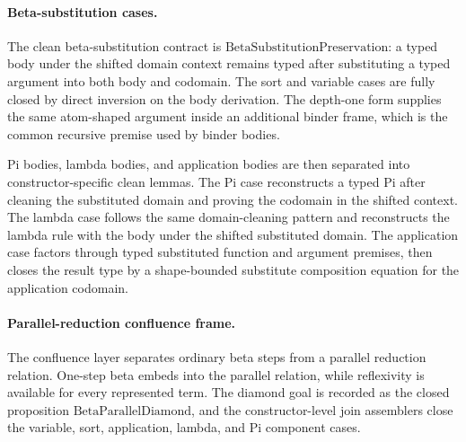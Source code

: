 \paragraph{Beta-substitution cases.}
The clean beta-substitution contract is
$\mathrm{BetaSubstitutionPreservation}$: a typed body under the shifted
domain context remains typed after substituting a typed argument into both body
and codomain. The sort and variable cases are fully closed by direct inversion
on the body derivation.
The depth-one form supplies the same atom-shaped argument inside an additional
binder frame, which is the common recursive premise used by binder bodies.

Pi bodies, lambda bodies, and application bodies are then separated into
constructor-specific clean lemmas. The Pi case reconstructs a typed Pi after
cleaning the substituted domain and proving the codomain in the shifted
context.
The lambda case follows the same domain-cleaning pattern and reconstructs the
lambda rule with the body under the shifted substituted domain.
The application case factors through typed substituted function and argument
premises, then closes the result type by a shape-bounded substitute composition
equation for the application codomain.

\paragraph{Parallel-reduction confluence frame.}
The confluence layer separates ordinary beta steps from a parallel reduction
relation. One-step beta embeds into the parallel relation, while reflexivity is
available for every represented term. The diamond goal is recorded as the
closed proposition $\mathrm{BetaParallelDiamond}$, and the constructor-level
join assemblers close the variable, sort, application, lambda, and Pi
component cases.

